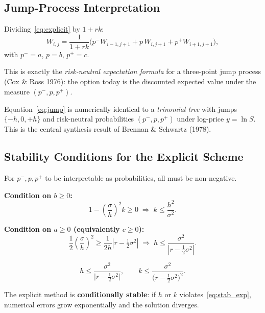 \documentclass[12pt,a4paper]{article}
\theoremstyle{plain}
\theoremstyle{definition}
\theoremstyle{remark}
\begin{document}
\subsection{Jump-Process Interpretation}

Dividing~\eqref{eq:explicit} by $1+rk$:
\begin{equation}\label{eq:jump}
  W_{i,j}=\frac{1}{1+rk}\bigl(p^{-}W_{i-1,j+1}+p\,W_{i,j+1}+p^{+}W_{i+1,j+1}\bigr),
\end{equation}
with $p^{-}=a$, $p=b$, $p^{+}=c$.

This is exactly the \emph{risk-neutral expectation formula} for a
three-point jump process (Cox \& Ross 1976): the option today is the
discounted expected value under the measure $(p^{-},p,p^{+})$.

\begin{keybox}
Equation~\eqref{eq:jump} is numerically identical to a \emph{trinomial tree}
with jumps $\{-h,0,+h\}$ and risk-neutral probabilities $(p^{-},p,p^{+})$
under log-price $y=\ln S$.  This is the central synthesis result of
Brennan \& Schwartz (1978).
\end{keybox}

\subsection{Stability Conditions for the Explicit Scheme}

For $p^{-},p,p^{+}$ to be interpretable as probabilities, all must be
non-negative.

\textbf{Condition on $b\geq0$:}
\[
  1-\left(\frac{\sigma}{h}\right)^{2}k\geq0
  \;\Longrightarrow\; k\leq\frac{h^{2}}{\sigma^{2}}.
\]

\textbf{Condition on $a\geq0$ (equivalently $c\geq0$):}
\[
  \frac{1}{2}\!\left(\frac{\sigma}{h}\right)^{2}
  \geq\frac{1}{2h}\!\left|r-\tfrac{1}{2}\sigma^{2}\right|
  \;\Longrightarrow\; h\leq\frac{\sigma^{2}}{\left|r-\tfrac{1}{2}\sigma^{2}\right|}.
\]

\begin{keybox}
\begin{equation}\label{eq:stab_exp}
  h\leq\frac{\sigma^{2}}{\bigl|r-\tfrac{1}{2}\sigma^{2}\bigr|},
  \qquad
  k\leq\frac{\sigma^{2}}{\bigl(r-\tfrac{1}{2}\sigma^{2}\bigr)^{2}}.
\end{equation}
\end{keybox}

\begin{warnbox}
The explicit method is \textbf{conditionally stable}: if $h$ or $k$
violates~\eqref{eq:stab_exp}, numerical errors grow exponentially and
the solution diverges.
\end{warnbox}
\end{document}
